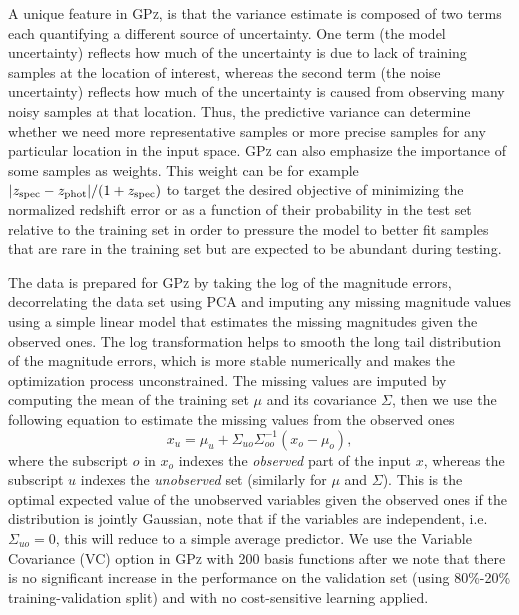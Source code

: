 A unique feature in \textsc{GPz}, is that the variance estimate is composed of two terms each quantifying a different source of uncertainty.
One term (the model uncertainty) reflects how much of the uncertainty is due to lack of training samples at the location of interest, whereas the second term (the noise uncertainty) reflects how much of the uncertainty is caused from observing many noisy samples at that location.
Thus, the predictive variance can determine whether we need more representative samples or more precise samples for any particular location in the input space.
\textsc{GPz} can also emphasize the importance of some samples as weights. This weight can be for example $|z_{\rm{spec}}-z_{\rm{phot}}|/(1+z_{\rm{spec}})$ to target the desired objective of minimizing the normalized redshift error or as a function of their probability in the test set relative to the training set in order to pressure the model to better fit samples that are rare in the training set but are expected to be abundant during testing.

The data is prepared for \textsc{GPz} by taking the log of the magnitude errors, decorrelating the data set using PCA and imputing any missing magnitude values using a simple linear model that estimates the missing magnitudes given the observed ones.
The log transformation helps to smooth the long tail distribution of the magnitude errors, which is more stable numerically and makes the optimization process unconstrained.
The missing values are imputed by computing the mean of the training set $\mu$ and its covariance $\Sigma$, then we use the following equation to estimate the missing values from the observed ones %
\begin{equation}
x_{u} = \mu_{u}+\Sigma_{uo}\Sigma_{oo}^{-1}(x_{o}-\mu_{o}),
\end{equation}  %
where the subscript $o$ in $x_{o}$ indexes the \emph{observed} part of the input $x$, whereas the subscript $u$ indexes the \emph{unobserved} set (similarly for $\mu$ and $\Sigma$).
This is the optimal expected value of the unobserved variables given the observed ones if the distribution is jointly Gaussian, note that if the variables are independent, i.e. $\Sigma_{uo}=0$, this will reduce to a simple average predictor.
We use the Variable Covariance (VC) option in \textsc{GPz} with 200 basis functions after we note that there is no significant increase in the performance on the validation set (using 80\%-20\% training-validation split) and with no cost-sensitive learning applied.


